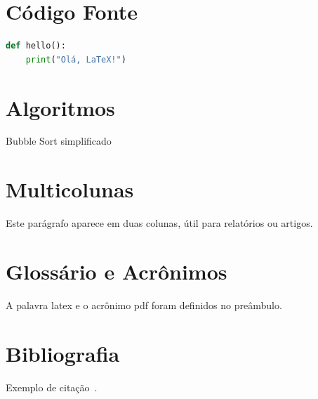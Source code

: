 \documentclass[12pt]{article}
\begin{document}
\section{Código Fonte}
\begin{lstlisting}[language=Python, caption=Exemplo em Python]
def hello():
    print("Olá, LaTeX!")
\end{lstlisting}

\section{Algoritmos}
\begin{algorithm}[H]
\SetAlgoLined
{}
\caption{Bubble Sort simplificado}
\end{algorithm}

\section{Multicolunas}
\begin{multicols}{2}
Este parágrafo aparece em duas colunas, útil para relatórios ou artigos.
\end{multicols}

\section{Glossário e Acrônimos}
A palavra \gls{latex} e o acrônimo \gls{pdf} foram definidos no preâmbulo.

\printglossary[type=\acronymtype]
\printglossary

\section{Bibliografia}
Exemplo de citação~\cite{knuth1984texbook}.

\printbibliography

\clearpage
\printindex
\end{document}
